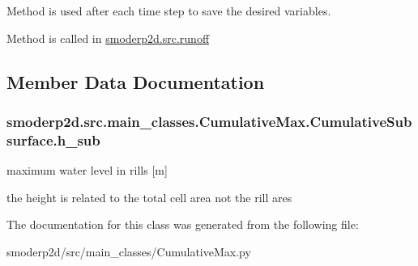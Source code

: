 Method is used after each time step to save the desired variables. 

Method is called in \hyperlink{namespacesmoderp2d_1_1src_1_1runoff}{smoderp2d.\-src.\-runoff} 

\subsection{Member Data Documentation}
\hypertarget{classsmoderp2d_1_1src_1_1main__classes_1_1CumulativeMax_1_1CumulativeSubsurface_a462419afbc95f9536beae247d390fb04}{
\subsubsection[{h\-\_\-sub}]{\setlength{\rightskip}{0pt plus 5cm}smoderp2d.\-src.\-main\-\_\-classes.\-Cumulative\-Max.\-Cumulative\-Subsurface.\-h\-\_\-sub}}\label{classsmoderp2d_1_1src_1_1main__classes_1_1CumulativeMax_1_1CumulativeSubsurface_a462419afbc95f9536beae247d390fb04}


maximum water level in rills \mbox{[}m\mbox{]} 

the height is related to the total cell area not the rill ares 

The documentation for this class was generated from the following file\-:\begin{DoxyCompactItemize}
\item 
smoderp2d/src/main\-\_\-classes/Cumulative\-Max.\-py\end{DoxyCompactItemize}
